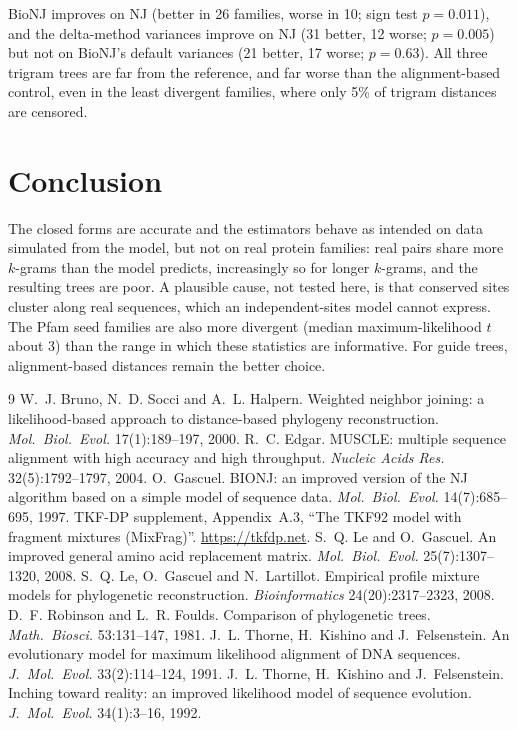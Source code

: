 \documentclass[11pt]{article}
\begin{document}
BioNJ improves on NJ (better in 26 families, worse in 10; sign test
$p=0.011$), and the delta-method variances improve on NJ (31 better, 12
worse; $p=0.005$) but not on BioNJ's default variances (21 better, 17 worse;
$p=0.63$). All three trigram trees are far from the reference, and far worse
than the alignment-based control, even in the least divergent families,
where only 5\% of trigram distances are censored.

\section{Conclusion}

The closed forms are accurate and the estimators behave as intended on data
simulated from the model, but not on real protein families: real pairs share
more $k$-grams than the model predicts, increasingly so for longer
$k$-grams, and the resulting trees are poor. A plausible cause, not tested
here, is that conserved sites cluster along real sequences, which an
independent-sites model cannot express. The Pfam seed families are also more
divergent (median maximum-likelihood $t$ about 3) than the range in which
these statistics are informative. For guide trees, alignment-based distances
remain the better choice.

\begin{thebibliography}{9}
W.~J. Bruno, N.~D. Socci and A.~L. Halpern. Weighted neighbor joining: a
likelihood-based approach to distance-based phylogeny reconstruction.
\emph{Mol.\ Biol.\ Evol.} 17(1):189--197, 2000.
R.~C. Edgar. MUSCLE: multiple sequence alignment with high accuracy and high
throughput. \emph{Nucleic Acids Res.} 32(5):1792--1797, 2004.
O.~Gascuel. BIONJ: an improved version of the NJ algorithm based on a simple
model of sequence data. \emph{Mol.\ Biol.\ Evol.} 14(7):685--695, 1997.
TKF-DP supplement, Appendix~A.3, ``The TKF92 model with fragment mixtures
(MixFrag)''. \url{https://tkfdp.net}.
S.~Q. Le and O.~Gascuel. An improved general amino acid replacement matrix.
\emph{Mol.\ Biol.\ Evol.} 25(7):1307--1320, 2008.
S.~Q. Le, O.~Gascuel and N.~Lartillot. Empirical profile mixture models for
phylogenetic reconstruction. \emph{Bioinformatics} 24(20):2317--2323, 2008.
D.~F. Robinson and L.~R. Foulds. Comparison of phylogenetic trees.
\emph{Math.\ Biosci.} 53:131--147, 1981.
J.~L. Thorne, H.~Kishino and J.~Felsenstein. An evolutionary model for
maximum likelihood alignment of DNA sequences. \emph{J.\ Mol.\ Evol.}
33(2):114--124, 1991.
J.~L. Thorne, H.~Kishino and J.~Felsenstein. Inching toward reality: an
improved likelihood model of sequence evolution. \emph{J.\ Mol.\ Evol.}
34(1):3--16, 1992.
\end{thebibliography}
\end{document}
